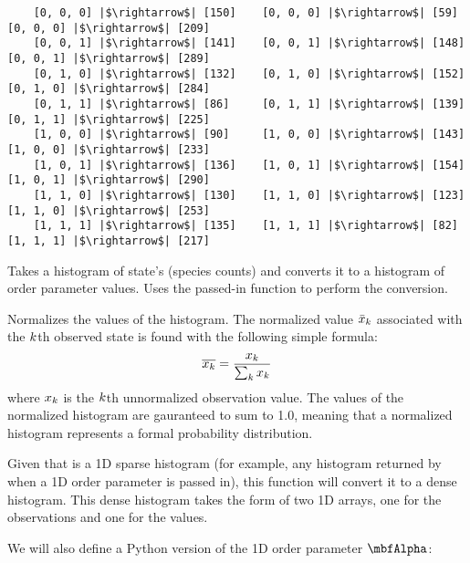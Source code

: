 \begin{description}[style=nextline]
\begin{verbatim}
    [0, 0, 0] |$\rightarrow$| [150]    [0, 0, 0] |$\rightarrow$| [59]      [0, 0, 0] |$\rightarrow$| [209]
    [0, 0, 1] |$\rightarrow$| [141]    [0, 0, 1] |$\rightarrow$| [148]     [0, 0, 1] |$\rightarrow$| [289]
    [0, 1, 0] |$\rightarrow$| [132]    [0, 1, 0] |$\rightarrow$| [152]     [0, 1, 0] |$\rightarrow$| [284]
    [0, 1, 1] |$\rightarrow$| [86]     [0, 1, 1] |$\rightarrow$| [139]     [0, 1, 1] |$\rightarrow$| [225]
    [1, 0, 0] |$\rightarrow$| [90]     [1, 0, 0] |$\rightarrow$| [143]     [1, 0, 0] |$\rightarrow$| [233]
    [1, 0, 1] |$\rightarrow$| [136]    [1, 0, 1] |$\rightarrow$| [154]     [1, 0, 1] |$\rightarrow$| [290]
    [1, 1, 0] |$\rightarrow$| [130]    [1, 1, 0] |$\rightarrow$| [123]     [1, 1, 0] |$\rightarrow$| [253]
    [1, 1, 1] |$\rightarrow$| [135]    [1, 1, 1] |$\rightarrow$| [82]      [1, 1, 1] |$\rightarrow$| [217]
\end{verbatim}
    \item[\code{calcOParamHist}]
        Takes a histogram of state's (\ie species counts) and converts it to a histogram of order parameter values. Uses the passed-in function  to perform the conversion.
    \item[\code{normHist}]
        Normalizes the values of the histogram. The normalized value $\bar{x}_{k}$ associated with the $k$th observed state is found with the following simple formula:
        \begin{equation}
            \overline{x_{k}} = \frac{x_{k}}{\sum_{k} x_{k}}
        \end{equation}
        where $x_{k}$ is the $k$th unnormalized observation value. The values of the normalized histogram are gauranteed to sum to 1.0, meaning that a normalized histogram represents a formal probability distribution.
    \item[\code{sparseToDense1D}] Given that  is a 1D sparse histogram (for example, any histogram returned by \\
     when a 1D order parameter is passed in), this function will convert it to a dense histogram. This dense histogram takes the form of two 1D arrays, one for the observations and one for the values.
\end{description}

We will also define a Python version of the 1D order parameter $\oparama$:


